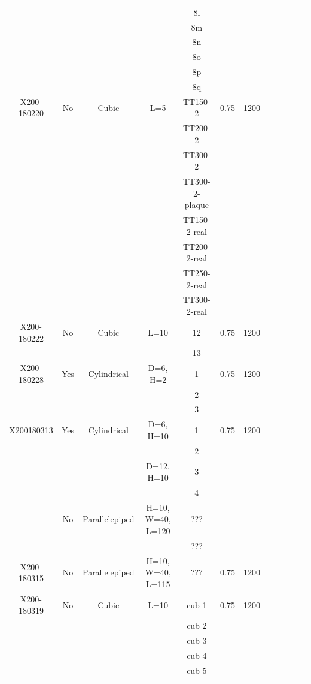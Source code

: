 \begin{center}
\begin{landscape}
\begin{savenotes}
\begin{longtable}{@{\extracolsep{\fill}}*{12}{|c}|@{}}
  & & & & 8l & & & & & & &\\
  & & & & 8m & & & & & & &\\
  & & & & 8n & & & & & & &\\
  & & & & 8o & & & & & & &\\     
  & & & & 8p & & & & & & &\\
  & & & & 8q & & & & & & &\\        
\hline  
  X200-180220 & No & Cubic & L=5 & TT150-2 & 0.75 & 1200 & & & & &\\
  & &  & & TT200-2 &  & & & & & &\\
  & &  & & TT300-2 &  & & & & & &\\
  & &  & & TT300-2-plaque &  & & & & & &\\
  & &  & & TT150-2-real &  & & & & & &\\
  & &  & & TT200-2-real &  & & & & & &\\
  & &  & & TT250-2-real &  & & & & & &\\
  & &  & & TT300-2-real &  & & & & & &\\
\hline  
  X200-180222 & No & Cubic & L=10 &12& 0.75 & 1200\\
  & &  & &13 &  & & & & & &\\
\hline  
  X200-180228  & Yes & Cylindrical & D=6, H=2 &1 & 0.75 & 1200 & & & & &\\
  & &  &  & 2&  & & & & & &\\
  & &  &  & 3 &  & & & & & &\\
\hline  
  X200180313 & Yes & Cylindrical & D=6, H=10&1& 0.75 & 1200 & & & & &\\
    & &    & &2 & & & & & & & \\
    & &  &D=12, H=10 &3& & & & & & & \\
    & & & &4 & & & & & & &\\
    & No & Parallelepiped & H=10, W=40, L=120 & ??? & & & & & & &\\
        &  & & & ??? & & & & & & &\\
\hline  
  X200-180315 & No & Parallelepiped & H=10, W=40, L=115& ??? & 0.75 & 1200 & & & & &\\
  \hline
  X200-180319  & No & Cubic & L=10 & cub 1 & 0.75 & 1200 & & & & &\\
  & &  & & cub 2 & & & & & & &\\
  & &  & & cub 3 & & & & & & &\\
  & & & & cub 4 & & & & & & &\\
  & & & & cub 5 & & & & & & &\\

\end{longtable}
\end{savenotes}
\end{landscape}
\end{center}
